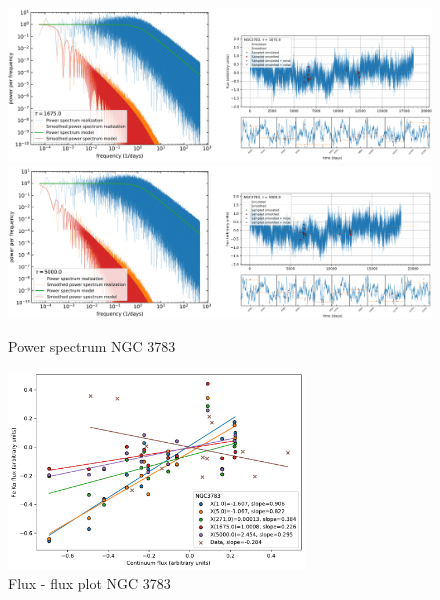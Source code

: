 \begin{figure}
\begin{center}
    {
  \includegraphics[width=\textwidth]{Figs/Chapter5/NGC3783/Screenshots/NGC3783_tau1675_LC_spectrum.pdf} \\
  \includegraphics[width=\textwidth]{Figs/Chapter5/NGC3783/Screenshots/NGC3783_tau5000_LC_spectrum.pdf} \\
  \caption{Power spectrum NGC 3783}
    \label{fig:power_spectra_2_NGC3783}
  }
\end{center}
\end{figure}

\begin{figure}
\begin{center}
    {
  \includegraphics[width=0.7\textwidth]{Figs/Chapter5/NGC3783/Flux_flux_NGC3783.pdf} \hfill 
  \caption{Flux - flux plot NGC 3783}
    \label{fig:Flux-flux_NGC3783}
  }
\end{center}
\end{figure}



